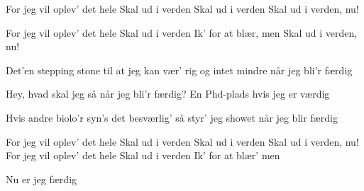 \documentclass[a4paper,12pt]{article}
\begin{document}
\begin{song}
For jeg vil oplev' det hele
Skal ud i verden
Skal ud i verden
Skal ud i verden, nu!

For jeg vil oplev' det hele
Skal ud i verden
Ik' for at blær, men
Skal ud i verden, nu!

Det'en stepping stone til
at jeg kan vær' rig
og intet mindre
når jeg bli'r færdig

Hey, hvad skal jeg så
når jeg bli'r færdig?
En Phd-plads
hvis jeg er værdig

Hvis andre biolo'r
syn's det besværlig'
så styr' jeg showet
når jeg blir færdig

For jeg vil oplev' det hele
Skal ud i verden
Skal ud i verden
Skal ud i verden, nu!
For jeg vil oplev' det hele
Skal ud i verden
Ik' for at blær' men

Nu er jeg færdig


\end{song}
\end{document}
